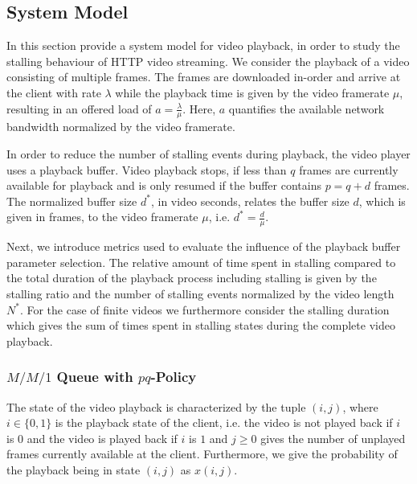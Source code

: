 \subsection{System Model}\label{sec:application:qoe_user_behaviour:system_model}
In this section provide a system model for video playback, in order to study the stalling behaviour of \gls{HTTP} video streaming.
We consider the playback of a video consisting of multiple frames.
The frames are downloaded in-order and arrive at the client with rate \(\lambda\) while the playback time is given by the video framerate \(\mu\), resulting in an offered load of \(a = \frac{\lambda}{\mu}\). Here, \(a\) quantifies the available network bandwidth normalized by the video framerate.

In order to reduce the number of stalling events during playback, the video player uses a playback buffer.
Video playback stops, if less than \(q\) frames are currently available for playback and is only resumed if the buffer contains \(p = q + d\) frames. 
The normalized buffer size \(d^*\), in video seconds, relates the buffer size \(d\), which is given in frames, to the video framerate \(\mu\), i.e. \(d^*=\frac{d}{\mu}\).

Next, we introduce metrics used to evaluate the influence of the playback buffer parameter selection.
The relative amount of time spent in stalling compared to the total duration of the playback process including stalling is given by the stalling ratio \stallingRatio and the number of stalling events normalized by the video length \(N^*\).
For the case of finite videos we furthermore consider the stalling duration \stallingDuration which gives the sum of times spent in stalling states during the complete video playback. 


\subsubsection*{\(M/M/1\) Queue with \(pq\)-Policy}\label{sec:application:qoe_user_behaviour:system_model:mm1pq}
The state of the video playback is characterized by the tuple \((i, j)\), where \(i \in \{0, 1\}\) is the playback state of the client, i.e. the video is not played back if \(i\) is \(0\) and the video is played back if \(i\) is \(1\) and \(j \geq 0\) gives the number of unplayed frames currently available at the client.
Furthermore, we give the probability of the playback being in state \((i, j)\) as \(x(i, j)\).

